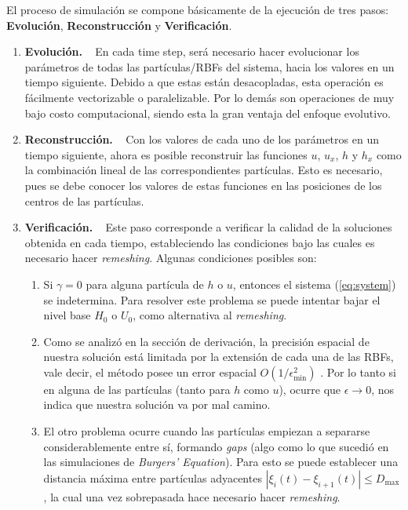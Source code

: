 \documentclass[spanish]{article} %
\providecommand{\DIFaddtex}[1]{{\protect\color{blue} \sf #1}} %
\providecommand{\DIFadd}[1]{\texorpdfstring{\DIFaddtex{#1}}{#1}} %
\begin{document}
    \DIFadd{El proceso de simulación se compone básicamente de la ejecución de tres pasos: \textbf{Evolución}, \textbf{Reconstrucción} y \textbf{Verificación}.
}

    \begin{enumerate}
        \item \DIFadd{\textbf{Evolución.} }\  \DIFadd{En cada time step, será necesario hacer evolucionar los parámetros de todas las partículas/RBFs del sistema, hacia los valores en un tiempo siguiente. Debido a que estas están desacopladas, esta operación es fácilmente vectorizable o paralelizable. Por lo demás son operaciones de muy bajo costo computacional, siendo esta la gran ventaja del enfoque evolutivo.
        }\item \DIFadd{\textbf{Reconstrucción.} }\ \DIFadd{Con los valores de cada uno de los parámetros en un tiempo siguiente, ahora es posible reconstruir las funciones $u$, $u_x$, $h$ y $h_x$ como la combinación lineal de las correspondientes partículas. Esto es necesario, pues se debe conocer los valores de estas funciones en las posiciones de los centros de las partículas.
        }\item \DIFadd{\textbf{Verificación.} }\ \DIFadd{Este paso corresponde a verificar la calidad de la soluciones obtenida en cada tiempo, estableciendo las condiciones bajo las cuales es necesario hacer \textit{remeshing}. Algunas condiciones posibles son:
}

        \begin{enumerate}
            \item \DIFadd{Si $\gamma=0$ para alguna partícula de $h$ o $u$, entonces el sistema (\ref{eq:system}) se indetermina. Para resolver este problema se puede intentar bajar el nivel base $H_0$ o $U_0$, como alternativa al \textit{remeshing}.
            }\item \DIFadd{Como se analizó en la sección de derivación, la precisión espacial de nuestra solución está limitada por la extensión de cada una de las RBFs, vale decir, el método posee un error espacial $\displaystyle O(1 / \epsilon_{\text{min}}^2)$ }\footnotemark[1]\DIFadd{. Por lo tanto si en alguna de las partículas (tanto para $h$ como $u$), ocurre que $\epsilon \rightarrow 0$, nos indica que nuestra solución va por mal camino.
            }\item \DIFadd{El otro problema ocurre cuando las partículas empiezan a separarse considerablemente entre sí, formando \textit{gaps} (algo como lo que sucedió en las simulaciones de \textit{Burgers' Equation}). Para esto se puede establecer una distancia máxima entre partículas adyacentes $|\xi_i(t)-\xi_{i+1}(t)| \leq D_{\text{max}}$, la cual una vez sobrepasada hace necesario hacer \textit{remeshing}.
        }\end{enumerate}
    \end{enumerate}
\end{document}
